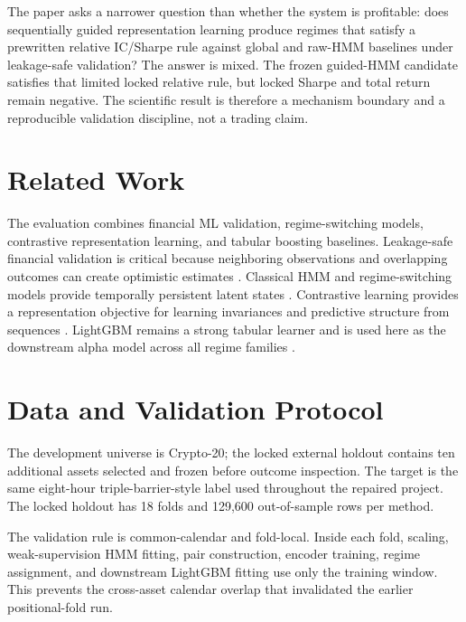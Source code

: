 \documentclass[sigconf,anonymous,review]{acmart}
\begin{document}
The paper asks a narrower question than whether the system is profitable: does sequentially guided representation learning produce regimes that satisfy a prewritten relative IC/Sharpe rule against global and raw-HMM baselines under leakage-safe validation? The answer is mixed. The frozen guided-HMM candidate satisfies that limited locked relative rule, but locked Sharpe and total return remain negative. The scientific result is therefore a mechanism boundary and a reproducible validation discipline, not a trading claim.

\section{Related Work}
The evaluation combines financial ML validation, regime-switching models, contrastive representation learning, and tabular boosting baselines. Leakage-safe financial validation is critical because neighboring observations and overlapping outcomes can create optimistic estimates \cite{lopezdeprado2018afml}. Classical HMM and regime-switching models provide temporally persistent latent states \cite{hamilton1989regime,rabiner1989hmm}. Contrastive learning provides a representation objective for learning invariances and predictive structure from sequences \cite{oord2018cpc,chen2020simclr}. LightGBM remains a strong tabular learner and is used here as the downstream alpha model across all regime families \cite{lightgbm2017}.

\section{Data and Validation Protocol}
The development universe is Crypto-20; the locked external holdout contains ten additional assets selected and frozen before outcome inspection. The target is the same eight-hour triple-barrier-style label used throughout the repaired project. The locked holdout has 18 folds and 129,600 out-of-sample rows per method.

The validation rule is common-calendar and fold-local. Inside each fold, scaling, weak-supervision HMM fitting, pair construction, encoder training, regime assignment, and downstream LightGBM fitting use only the training window. This prevents the cross-asset calendar overlap that invalidated the earlier positional-fold run.
\end{document}
